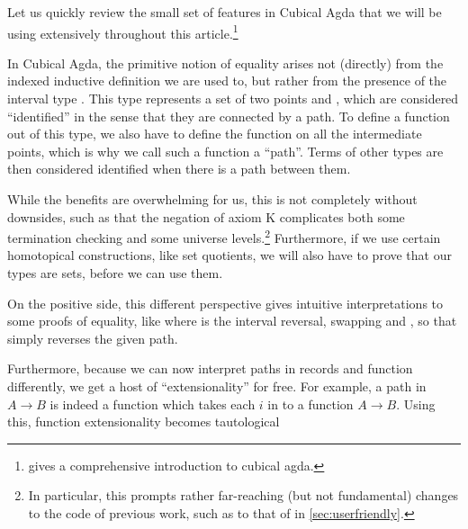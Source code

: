 Let us quickly review the small set of features in Cubical Agda that we will be using extensively throughout this article.\footnote{\cite{cuagda} gives a comprehensive introduction to cubical agda.}

In Cubical Agda, the primitive notion of equality arises not (directly) from the indexed inductive definition we are used to, but rather from the presence of the interval type . This type represents a set of two points  and , which are considered ``identified'' in the sense that they are connected by a path. To define a function out of this type, we also have to define the function on all the intermediate points, which is why we call such a function a ``path''. Terms of other types are then considered identified when there is a path between them.

While the benefits are overwhelming for us, this is not completely without downsides, such as that
the negation of axiom K complicates both some termination checking and some universe levels.\footnote{In particular, this prompts rather far-reaching (but not fundamental) changes to the code of previous work, such as to that of \cite{progorn} in \autoref{sec:userfriendly}.} Furthermore, if we use certain homotopical constructions, like set quotients, we will also have to prove that our types are sets, before we can use them.

On the positive side, this different perspective gives intuitive interpretations to some proofs of equality, like
where  is the interval reversal, swapping  and , so that  simply reverses the given path.

Furthermore, because we can now interpret paths in records and function differently, we get a host of ``extensionality'' for free. For example, a path in $A \to B$ is indeed a function which takes each $i$ in  to a function $A \to B$. Using this, function extensionality becomes tautological 

